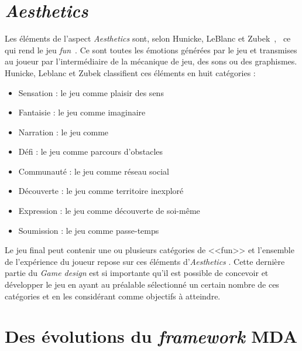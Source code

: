 \section{\emph{Aesthetics}}
Les \'el\'ements de l'aspect \emph{Aesthetics} sont, selon Hunicke, LeBlanc et Zubek~\cite{MDA_formal}, \guillemotleft~ce qui rend le jeu \emph{fun}~\guillemotright. 
Ce sont toutes les émotions générées par le jeu et transmises au joueur par l'interm\'ediaire de la mécanique de jeu, des sons ou des graphismes. Hunicke, Leblanc et Zubek classifient ces \'el\'ements en huit catégories :
\begin{itemize}
    \item Sensation : le jeu comme plaisir des sens
    \item Fantaisie : le jeu comme imaginaire
    \item Narration : le jeu comme 
    \item D\'efi : le jeu comme parcours d'obstacles
    \item Communauté : le jeu comme réseau social
    \item Découverte : le jeu comme territoire inexploré
    \item Expression : le jeu comme découverte de soi-même
    \item Soumission : le jeu comme passe-temps
\end{itemize}


Le jeu final peut contenir une ou plusieurs catégories de <<fun>> et l'ensemble de l'expérience du joueur repose sur ces \'el\'ements d'\emph{Aesthetics} . 
Cette dernière partie du \emph{Game design} est si importante qu'il est possible de concevoir et développer le jeu en ayant au préalable sélectionné un certain nombre de ces catégories et en les considérant comme objectifs à atteindre.




\section{Des évolutions du \emph{framework} MDA}



